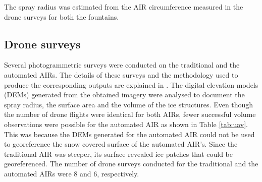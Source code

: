 \documentclass[tc, manuscript]{copernicus}
\begin{document}
The spray radius was estimated from the AIR circumference measured in the drone surveys for both the fountains.  

\subsection{Drone surveys}

Several photogrammetric surveys were conducted on the traditional and the automated AIRs. The details of these
surveys and the methodology used to produce the corresponding outputs are explained in
\cite{balasubramanianInfluenceMeteorologicalConditions2022}. The digital elevation models (DEMs) generated from
the obtained imagery were analysed to document the spray radius, the surface area and the volume of the ice
structures. Even though the number of drone flights were identical for both AIRs, fewer successful volume
observations were possible for the automated AIR as shown in Table \ref{tab:uav}. This was because the DEMs
generated for the automated AIR could not be used to georeference the snow covered surface of the automated AIR's. Since the
traditional AIR was steeper, its surface revealed ice patches that could be georeferenced. The number of drone
surveys conducted for the traditional and the automated AIRs were 8 and 6, respectively. 
\end{document}
